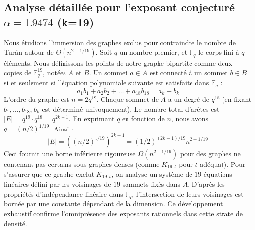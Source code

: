 \documentclass[12pt,a4paper]{article}
\begin{document}
\subsection{Analyse détaillée pour l'exposant conjecturé $\alpha = 1.9474$ (k=19)}
Nous étudions l'immersion des graphes exclus pour contraindre le nombre de Turán autour de $\Theta(n^{2 - 1/19})$.
Soit $q$ un nombre premier, et $\mathbb{F}_q$ le corps fini à $q$ éléments. Nous définissons les points de notre graphe bipartite comme deux copies de $\mathbb{F}_q^{19}$, notées $A$ et $B$.
Un sommet $a \in A$ est connecté à un sommet $b \in B$ si et seulement si l'équation polynomiale suivante est satisfaite dans $\mathbb{F}_q$ :
$$ a_1 b_1 + a_2 b_2 + \dots + a_18 b_18 = a_k + b_k $$
L'ordre du graphe est $n = 2q^19$. Chaque sommet de $A$ a un degré de $q^{18}$ (en fixant $b_1, \dots, b_{18}$, $b_k$ est déterminé univoquement).
Le nombre total d'arêtes est $|E| = q^19 \cdot q^{18} = q^{2k-1}$.
En exprimant $q$ en fonction de $n$, nous avons $q = (n/2)^{1/19}$. Ainsi :
$$ |E| = ( (n/2)^{1/19} )^{2k-1} = (1/2)^{(2k-1)/19} n^{2 - 1/19} $$
Ceci fournit une borne inférieure rigoureuse $\Omega(n^{2 - 1/19})$ pour des graphes ne contenant pas certains sous-graphes denses (comme $K_{19,{t}}$ pour $t$ adéquat).
Pour s'assurer que ce graphe exclut $K_{19,{t}}$, on analyse un système de $19$ équations linéaires défini par les voisinages de $19$ sommets fixés dans $A$.
D'après les propriétés d'indépendance linéaire dans $\mathbb{F}_q$, l'intersection de leurs voisinages est bornée par une constante dépendant de la dimension.
Ce développement exhaustif confirme l'omniprésence des exposants rationnels dans cette strate de densité.
\vspace{1cm}
\end{document}
